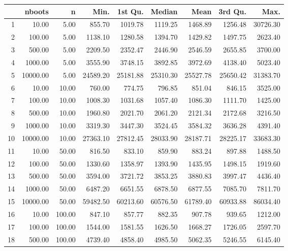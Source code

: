 \begin{table}[ht]
\centering
\begin{tabular}{rrrrrrrrr}
  \hline
 & nboots & n & Min. & 1st Qu. & Median & Mean & 3rd Qu. & Max. \\ 
  \hline
1 & 10.00 & 5.00 & 855.70 & 1019.78 & 1119.25 & 1468.89 & 1256.48 & 30726.30 \\ 
  2 & 100.00 & 5.00 & 1138.10 & 1280.58 & 1394.70 & 1429.82 & 1497.75 & 2623.40 \\ 
  3 & 500.00 & 5.00 & 2209.50 & 2352.47 & 2446.90 & 2546.59 & 2655.85 & 3700.00 \\ 
  4 & 1000.00 & 5.00 & 3555.90 & 3748.15 & 3892.85 & 3972.69 & 4138.40 & 5023.40 \\ 
  5 & 10000.00 & 5.00 & 24589.20 & 25181.88 & 25310.30 & 25527.78 & 25650.42 & 31383.70 \\ 
  6 & 10.00 & 10.00 & 760.00 & 774.75 & 796.85 & 851.04 & 846.15 & 3525.00 \\ 
  7 & 100.00 & 10.00 & 1008.30 & 1031.68 & 1057.40 & 1086.30 & 1111.70 & 1425.00 \\ 
  8 & 500.00 & 10.00 & 1960.80 & 2021.70 & 2061.20 & 2121.34 & 2172.68 & 3216.50 \\ 
  9 & 1000.00 & 10.00 & 3319.30 & 3447.30 & 3524.45 & 3584.32 & 3636.28 & 4391.40 \\ 
  10 & 10000.00 & 10.00 & 27363.10 & 27812.45 & 28033.90 & 28187.71 & 28225.17 & 33683.30 \\ 
  11 & 10.00 & 50.00 & 816.50 & 833.10 & 859.90 & 883.24 & 897.88 & 1488.50 \\ 
  12 & 100.00 & 50.00 & 1330.60 & 1358.97 & 1393.90 & 1435.95 & 1498.15 & 1919.60 \\ 
  13 & 500.00 & 50.00 & 3594.00 & 3721.72 & 3853.25 & 3880.83 & 3997.47 & 4436.40 \\ 
  14 & 1000.00 & 50.00 & 6487.20 & 6651.55 & 6878.50 & 6877.55 & 7085.70 & 7811.70 \\ 
  15 & 10000.00 & 50.00 & 59482.50 & 60213.60 & 60576.50 & 61789.40 & 60933.88 & 86034.40 \\ 
  16 & 10.00 & 100.00 & 847.10 & 857.77 & 882.35 & 907.78 & 939.65 & 1212.00 \\ 
  17 & 100.00 & 100.00 & 1544.00 & 1581.55 & 1626.50 & 1668.27 & 1726.05 & 2597.70 \\ 
  18 & 500.00 & 100.00 & 4739.40 & 4858.40 & 4985.50 & 5062.35 & 5246.55 & 6145.40 \\ 

\end{tabular}
\end{table}
